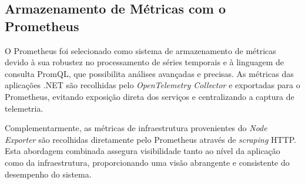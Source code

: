\subsection{Armazenamento de Métricas com o Prometheus}
O Prometheus foi selecionado como sistema de armazenamento de métricas devido à sua robustez no processamento de séries temporais e à linguagem de consulta PromQL, que possibilita análises avançadas e precisas. As métricas das aplicações .NET são recolhidas pelo \textit{OpenTelemetry Collector} e exportadas para o Prometheus, evitando exposição direta dos serviços e centralizando a captura de telemetria.

Complementarmente, as métricas de infraestrutura provenientes do \textit{Node Exporter} são recolhidas diretamente pelo Prometheus através de \textit{scraping} HTTP. Esta abordagem combinada assegura visibilidade tanto ao nível da aplicação como da infraestrutura, proporcionando uma visão abrangente e consistente do desempenho do sistema.
